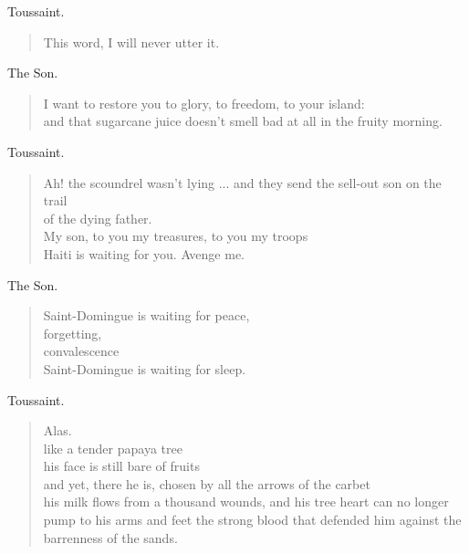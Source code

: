 \documentclass[letterpaper,article,12pt,oneside,notitlepage]{memoir}
\begin{document}
\begin{center}Toussaint.\end{center}

\begin{verse}
This word, I will never utter it. \\
\end{verse}

\begin{center}The Son.\end{center}

\begin{verse}
I want to restore you to glory, to freedom, to your island: \\
and that sugarcane juice doesn't smell bad at all in the fruity morning. \\
\end{verse}

\begin{center}Toussaint.\end{center}

\begin{verse}
Ah! the scoundrel wasn't lying ... and they send the sell-out son on the trail \\
of the dying father. \\
My son, to you my treasures, to you my troops \\
Haiti is waiting for you. Avenge me. \\
\end{verse}

\clearpage

\begin{center}The Son.\end{center}

\begin{verse}
Saint-Domingue is waiting for peace, \\
forgetting, \\
convalescence \\
Saint-Domingue is waiting for sleep. \\
\end{verse}

\begin{center}Toussaint.\end{center}

\begin{verse}
Alas. \\
like a tender papaya tree \\
his face is still bare of fruits \\
and yet, there he is, chosen by all the arrows of the carbet \\
his milk flows from a thousand wounds, and his tree heart can no longer pump to his arms and feet the strong blood that defended him against the barrenness of the sands. \\
\end{verse}
\end{document}
